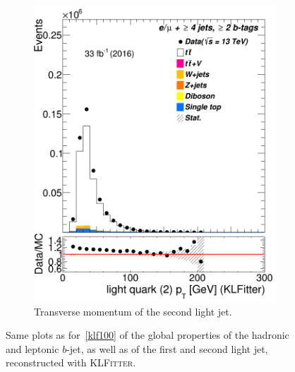\begin{figure}
\begin{subfigure}{0.25\textwidth}
		\includegraphics[width=\linewidth]{ControlPlots_emujets_2016_4incl_2incl/klf_lq2_pt_emujets_2016.png}
		\caption{Transverse momentum of the second light jet.} \label{fig:K43}
	\end{subfigure}
	
	\caption{Same plots as for~\cref{klf100} of the global properties of the hadronic and leptonic $b$-jet, as well as of the first and second light jet, reconstructed with \textsc{KLFitter}. }
\end{figure}











